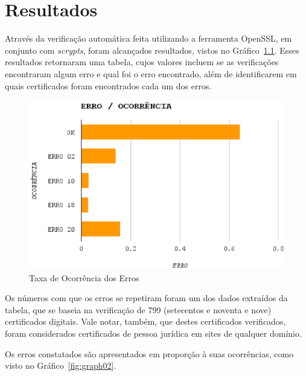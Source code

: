 

\chapter[Resultados]{Resultados}

	Através da verificação automática feita utilizando a ferramenta OpenSSL, em conjunto com \textit{scrypts}, foram alcançados resultados, vistos no Gráfico~\ref{fig:graph01}. Esses resultados retornaram uma tabela, cujos valores incluem se as verificações encontraram algum erro e qual foi o erro encontrado, além de identificarem em quais certificados foram encontrados cada um dos erros.

	\begin{figure}[h]
		\centering
		\includegraphics[keepaspectratio=true,scale=1]{figuras/graph01.eps}
		\caption{Taxa de Ocorrência dos Erros}
		\label{fig:graph01}
	\end{figure}

	Os números com que os erros se repetiram foram um dos dados extraídos da tabela, que se baseia na verificação de 799 (setecentos e noventa e nove) certificados digitais. Vale notar, também, que destes certificados verificados, foram considerados certificados de pessoa jurídica em sites de qualquer domínio.

	Os erros constatados são apresentados em proporção à suas ocorrências, como visto no Gráfico~\ref{fig:graph02}.

